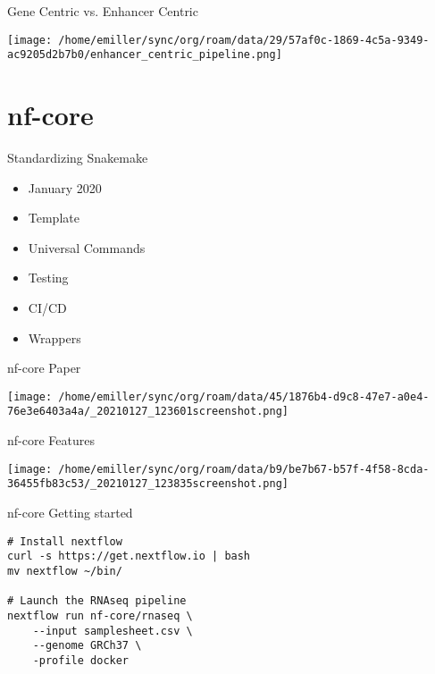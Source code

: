 \documentclass[bigger]{beamer}
\begin{document}
\begin{frame}[label={sec:org6dad36b}]{Gene Centric vs. Enhancer Centric}
\begin{center}
\texttt{[image: /home/emiller/sync/org/roam/data/29/57af0c-1869-4c5a-9349-ac9205d2b7b0/enhancer\_centric\_pipeline.png]}
\end{center}
\end{frame}

\section{nf-core}
\label{sec:org14268a6}

\begin{frame}[label={sec:org5a6b3d4}]{Standardizing Snakemake}
\begin{itemize}
\item January 2020
\item Template
\item Universal Commands
\item Testing
\item CI/CD
\item Wrappers
\end{itemize}
\end{frame}

\begin{frame}[label={sec:orgaa597db}]{nf-core Paper}
\begin{center}
\texttt{[image: /home/emiller/sync/org/roam/data/45/1876b4-d9c8-47e7-a0e4-76e3e6403a4a/\_20210127\_123601screenshot.png]}
\end{center}
\end{frame}

\begin{frame}[label={sec:org6e5502c}]{nf-core Features}
\begin{center}
\texttt{[image: /home/emiller/sync/org/roam/data/b9/be7b67-b57f-4f58-8cda-36455fb83c53/\_20210127\_123835screenshot.png]}
\end{center}
\end{frame}

\begin{frame}[label={sec:org51f0943},fragile]{nf-core Getting started}
 \begin{verbatim}
# Install nextflow
curl -s https://get.nextflow.io | bash
mv nextflow ~/bin/

# Launch the RNAseq pipeline
nextflow run nf-core/rnaseq \
    --input samplesheet.csv \
    --genome GRCh37 \
    -profile docker
\end{verbatim}
\end{frame}
\end{document}
